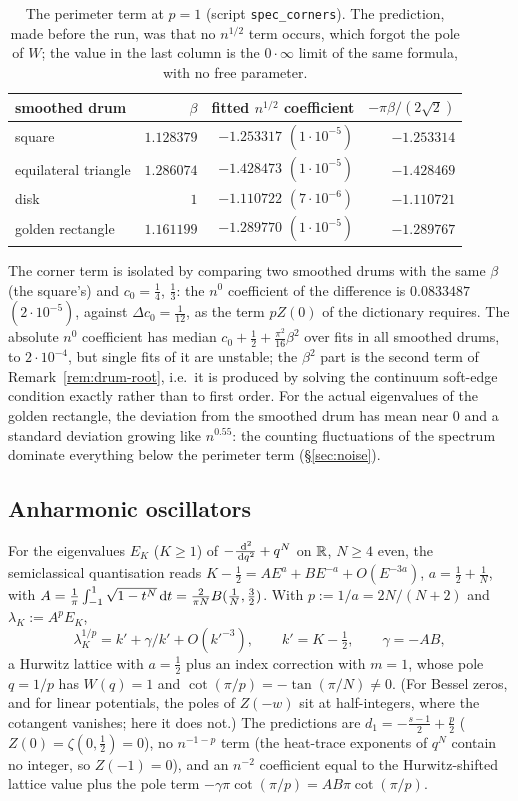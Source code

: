 \begin{table}[ht]
\centering
\small
\begin{tabular}{lrrr}
\toprule
smoothed drum & $\beta$ & fitted $n^{1/2}$ coefficient & $-\pi\beta/(2\sqrt2)$\\
\midrule
square & $1.128379$ & $-1.253317$ $(1\cdot10^{-5})$ & $-1.253314$\\
equilateral triangle & $1.286074$ & $-1.428473$ $(1\cdot10^{-5})$ & $-1.428469$\\
disk & $1$ & $-1.110722$ $(7\cdot10^{-6})$ & $-1.110721$\\
golden rectangle & $1.161199$ & $-1.289770$ $(1\cdot10^{-5})$ & $-1.289767$\\
\bottomrule
\end{tabular}
\caption{The perimeter term at $p=1$ (script \texttt{spec\_corners}). The prediction, made before the run, was that no
$n^{1/2}$ term occurs, which forgot the pole of $W$; the value in the last column is the $0\cdot\infty$ limit of the same
formula, with no free parameter.}
\label{tab:drums}
\end{table}

The corner term is isolated by comparing two smoothed drums with the same $\beta$ (the square's) and $c_0=\frac14$,
$\frac13$: the $n^0$ coefficient of the difference is $0.0833487$ $(2\cdot10^{-5})$, against $\Delta c_0=\frac1{12}$, as the term
$pZ(0)$ of the dictionary requires. The absolute $n^0$ coefficient has median $c_0+\frac12+\frac{\pi^2}{16}\beta^2$ over fits
in all smoothed drums, to $2\cdot10^{-4}$, but single fits of it are unstable; the $\beta^2$ part is the second term of
Remark~\ref{rem:drum-root}, i.e.\ it is produced by solving the continuum soft-edge condition exactly rather than to first
order. For the actual eigenvalues of the golden rectangle, the deviation from the smoothed drum has mean near $0$ and a
standard deviation growing like $n^{0.55}$: the counting fluctuations of the spectrum dominate everything below the
perimeter term (\S\ref{sec:noise}).

\subsection{Anharmonic oscillators}\label{sec:quartic}
For the eigenvalues $E_K$ ($K\ge1$) of $-\frac{\,\mathrm{d}^2}{\,\mathrm{d} q^2}+q^N$ on $\mathbb{R}$, $N\ge4$ even, the semiclassical
quantisation reads $K-\frac12=AE^{a}+BE^{-a}+O(E^{-3a})$, $a=\frac12+\frac1N$, with
$A=\frac1\pi\int_{-1}^1\sqrt{1-t^N}\,\mathrm{d} t=\frac2{\pi N}B(\frac1N,\frac32)$. With $p:=1/a=2N/(N+2)$ and $\lambda_K:=A^pE_K$,
\[
  \lambda_K^{1/p}=k'+\gamma/k'+O(k'^{-3}),\qquad k'=K-\tfrac12,\qquad\gamma=-AB,
\]
a Hurwitz lattice with $a=\frac12$ plus an index correction with $m=1$, whose pole $q=1/p$ has $W(q)=1$ and
$\cot(\pi/p)=-\tan(\pi/N)\ne0$. (For Bessel zeros, and for linear potentials, the poles of $Z(-w)$ sit at half-integers,
where the cotangent vanishes; here it does not.) The predictions are $d_1=-\frac{s-1}2+\frac p2$ ($Z(0)=\zeta(0,\frac12)=0$), no $n^{-1-p}$ term (the
heat-trace exponents of $q^N$ contain no integer, so $Z(-1)=0$), and an $n^{-2}$ coefficient equal to the Hurwitz-shifted
lattice value plus the pole term $-\gamma\pi\cot(\pi/p)=AB\pi\cot(\pi/p)$.

